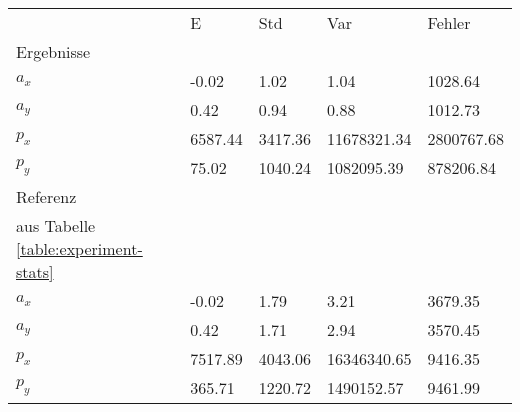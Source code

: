 \begin{tabular}{l|l|l|l|l}

     & E   & Std    & Var    & Fehler \\
\hhline{=|=|=|=|=}

Ergebnisse & & & & \\
$a_x$  &        -0.02 &         1.02 &         1.04 &      1028.64 \\
$a_y$  &         0.42 &         0.94 &         0.88 &      1012.73 \\
$p_x$  &      6587.44 &      3417.36 &  11678321.34 &   2800767.68 \\
$p_y$  &        75.02 &      1040.24 &   1082095.39 &    878206.84 \\

\hline
Referenz & & & & \\
aus Tabelle  \ref{table:experiment-stats} & & & & \\
$a_x$  &        -0.02 &         1.79 &         3.21 &      3679.35 \\
$a_y$  &         0.42 &         1.71 &         2.94 &      3570.45 \\
$p_x$  &      7517.89 &      4043.06 &  16346340.65 &      9416.35 \\
$p_y$  &       365.71 &      1220.72 &   1490152.57 &      9461.99 \\
\end{tabular}

